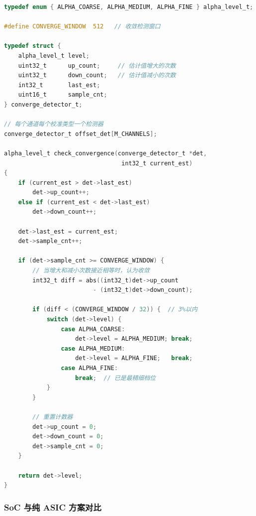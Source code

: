 \documentclass[UTF8,a4paper,11pt]{ctexart}
\begin{document}
\begin{lstlisting}[language=C, caption={PS端：alpha档位切换与收敛检测}]
typedef enum { ALPHA_COARSE, ALPHA_MEDIUM, ALPHA_FINE } alpha_level_t;

#define CONVERGE_WINDOW  512   // 收敛检测窗口

typedef struct {
    alpha_level_t level;
    uint32_t      up_count;     // 估计值增大的次数
    uint32_t      down_count;   // 估计值减小的次数
    int32_t       last_est;
    uint16_t      sample_cnt;
} converge_detector_t;

// 每个通道每个校准类型一个检测器
converge_detector_t offset_det[M_CHANNELS];

alpha_level_t check_convergence(converge_detector_t *det, 
                                 int32_t current_est)
{
    if (current_est > det->last_est) 
        det->up_count++;
    else if (current_est < det->last_est) 
        det->down_count++;
    
    det->last_est = current_est;
    det->sample_cnt++;
    
    if (det->sample_cnt >= CONVERGE_WINDOW) {
        // 当增大和减小次数接近相等时，认为收敛
        int32_t diff = abs((int32_t)det->up_count 
                         - (int32_t)det->down_count);
        
        if (diff < (CONVERGE_WINDOW / 32)) {  // 3%以内
            switch (det->level) {
                case ALPHA_COARSE:  
                    det->level = ALPHA_MEDIUM; break;
                case ALPHA_MEDIUM:  
                    det->level = ALPHA_FINE;   break;
                case ALPHA_FINE:    
                    break;  // 已是最精细档位
            }
        }
        
        // 重置计数器
        det->up_count = 0;
        det->down_count = 0;
        det->sample_cnt = 0;
    }
    
    return det->level;
}
\end{lstlisting}

\subsubsection{SoC 与纯 ASIC 方案对比}
\end{document}
